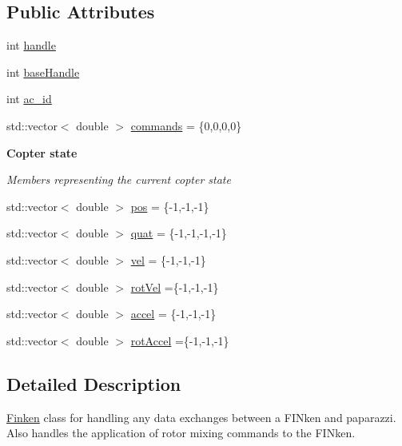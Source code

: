 \subsection*{Public Attributes}
\begin{DoxyCompactItemize}
\item 
int \hyperlink{classFinken_a96990553bc26c8bf26effe8edd6e6369}{handle}
\item 
int \hyperlink{classFinken_aef4736605ea21831e5340f66a931f8ac}{base\+Handle}
\item 
int \hyperlink{classFinken_a5f40217a024b5e912d6741ee5c206b19}{ac\+\_\+id}
\item 
std\+::vector$<$ double $>$ \hyperlink{classFinken_aa4fe546d88b52ff92990bd67ced70567}{commands} = \{0,0,0,0\}
\end{DoxyCompactItemize}
\begin{Indent}{\bf Copter state}\par
{\em \label{classFinken_copterstate}%
\hypertarget{classFinken_copterstate}{}%
 Members representing the current copter state }\begin{DoxyCompactItemize}
\item 
std\+::vector$<$ double $>$ \hyperlink{classFinken_a726c0ea1d756fe0837a3f042665d8d4a}{pos} = \{-\/1,-\/1,-\/1\}
\item 
std\+::vector$<$ double $>$ \hyperlink{classFinken_a3968cbe3b6f76678367ecb61f044a221}{quat} = \{-\/1,-\/1,-\/1,-\/1\}
\item 
std\+::vector$<$ double $>$ \hyperlink{classFinken_a4dd260e6384e7cfb8040bd53fe1c2d62}{vel} = \{-\/1,-\/1,-\/1\}
\item 
std\+::vector$<$ double $>$ \hyperlink{classFinken_a518ab8ab8ac8cf54c0b79cbc1ec2075f}{rot\+Vel} =\{-\/1,-\/1,-\/1\}
\item 
std\+::vector$<$ double $>$ \hyperlink{classFinken_a6f9723479baee5573447036270a2a722}{accel} = \{-\/1,-\/1,-\/1\}
\item 
std\+::vector$<$ double $>$ \hyperlink{classFinken_ab1b738a1b691879be240b1b9488f7009}{rot\+Accel} =\{-\/1,-\/1,-\/1\}
\end{DoxyCompactItemize}
\end{Indent}


\subsection{Detailed Description}
\hyperlink{classFinken}{Finken} class for handling any data exchanges between a F\+I\+Nken and paparazzi. Also handles the application of rotor mixing commands to the F\+I\+Nken. 

